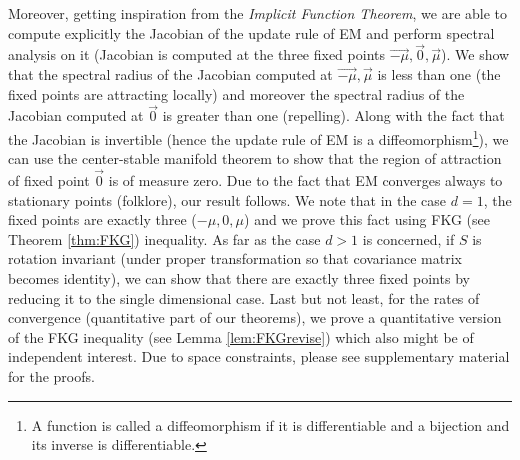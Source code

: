 Moreover, getting inspiration from the \textit{Implicit Function Theorem}, we are able to compute explicitly the Jacobian of the update rule of EM and perform spectral analysis on it (Jacobian is computed at the three fixed points $\vec{-\mu},\vec{0}, \vec{\mu}$). We show that the spectral radius of the Jacobian computed at $\vec{-\mu},\vec{\mu}$ is less than one (the fixed points are attracting locally) and moreover the spectral radius of the Jacobian computed at $\vec{0}$ is greater than one (repelling). Along with the fact that the Jacobian is invertible (hence the update rule of EM is a diffeomorphism\footnote{A function is called a diffeomorphism if it is differentiable and a bijection and its inverse is differentiable.}), we can use the center-stable manifold theorem to show that the region of attraction of fixed point $\vec{0}$ is of measure zero. Due to the fact that EM converges always to stationary points (folklore), our result follows. We note that in the case $d=1$, the fixed points are exactly three ($-\mu,0,\mu$) and we prove this fact using FKG (see Theorem \ref{thm:FKG}) inequality. As far as the case $d>1$ is concerned, if $S$ is rotation invariant (under proper transformation so that covariance matrix becomes identity), we can show that there are exactly three fixed points by reducing it to the single dimensional case. Last but not least, for the rates of convergence (quantitative part of our theorems), we prove a quantitative version of the FKG inequality (see Lemma \ref{lem:FKGrevise}) which also might be of independent interest. Due to space constraints, please see supplementary material for the proofs.
